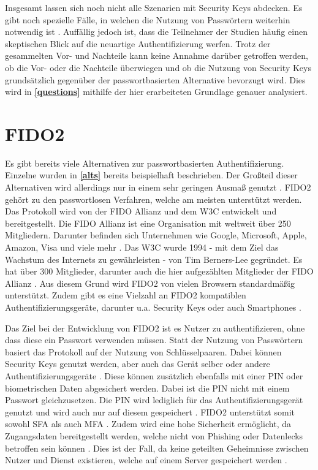 Insgesamt lassen sich noch nicht alle Szenarien mit Security Keys abdecken. Es gibt noch spezielle Fälle, in welchen die Nutzung von Passwörtern weiterhin notwendig ist \cite{lyastani2020fido2}. Auffällig jedoch ist, dass die Teilnehmer der Studien häufig einen skeptischen Blick auf die neuartige Authentifizierung werfen. Trotz der gesammelten Vor- und Nachteile kann keine Annahme darüber getroffen werden, ob die Vor- oder die Nachteile überwiegen und ob die Nutzung von Security Keys grundsätzlich gegenüber der passwortbasierten Alternative bevorzugt wird. Dies wird in \textbf{\ref{questions}} mithilfe der hier erarbeiteten Grundlage genauer analysiert.

\section{FIDO2} \label{fido2}

Es gibt bereits viele Alternativen zur passwortbasierten Authentifizierung. Einzelne wurden in \textbf{\ref{alts}} bereits beispielhaft beschrieben. Der Großteil dieser Alternativen wird allerdings nur in einem sehr geringen Ausmaß genutzt \cite{farke2020you}. \ac{FIDO}2 gehört zu den passwortlosen Verfahren, welche am meisten unterstützt werden. Das Protokoll wird von der \ac{FIDO} Allianz und dem \ac{W3C} entwickelt und bereitgestellt. Die \ac{FIDO} Allianz ist eine Organisation mit weltweit über 250 Mitgliedern. Darunter befinden sich Unternehmen wie Google, Microsoft, Apple, Amazon, Visa und viele mehr  \cite{lyastani2020fido2} \cite{farke2020you}. Das \ac{W3C} wurde 1994 - mit dem Ziel das Wachstum des Internets zu gewährleisten - von Tim Berners-Lee gegründet. Es hat über 300 Mitglieder, darunter auch die hier aufgezählten Mitglieder der \ac{FIDO} Allianz \cite{w3cabout}. Aus diesem Grund wird \ac{FIDO}2 von vielen Browsern standardmäßig unterstützt. Zudem gibt es eine Vielzahl an \ac{FIDO}2 kompatiblen Authentifizierungsgeräte, darunter u.a. Security Keys oder auch Smartphones \cite{lyastani2020fido2}.

Das Ziel bei der Entwicklung von \ac{FIDO}2 ist es Nutzer zu authentifizieren, ohne dass diese ein Passwort verwenden müssen. Statt der Nutzung von Passwörtern basiert das Protokoll auf der Nutzung von Schlüsselpaaren. Dabei können Security Keys genutzt werden, aber auch das Gerät selber oder andere Authentifizierungsgeräte \cite{barbosa2021provable} \cite{morii2017research}. Diese können zusätzlich ebenfalls mit einer PIN oder biometrischen Daten abgesichert werden. Dabei ist die PIN nicht mit einem Passwort gleichzusetzen. Die PIN wird lediglich für das Authentifizierungsgerät genutzt und wird auch nur auf diesem gespeichert \cite{farke2020you} \cite{barbosa2021provable}. \ac{FIDO}2 unterstützt somit sowohl \ac{SFA} als auch \ac{MFA} \cite{lyastani2020fido2} \cite{farke2020you}. Zudem wird eine hohe Sicherheit ermöglicht, da Zugangsdaten bereitgestellt werden, welche nicht von Phishing oder Datenlecks betroffen sein können \cite{lyastani2020fido2}. Dies ist der Fall, da keine geteilten Geheimnisse zwischen Nutzer und Dienst existieren, welche auf einem Server gespeichert werden \cite{morii2017research}. 

